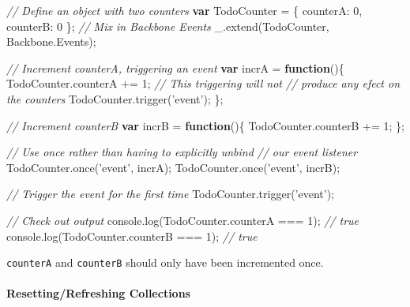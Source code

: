 \documentclass[9pt]{book}
\newenvironment{Shaded}{}{}
\newcommand{\KeywordTok}[1]{\textcolor[rgb]{0.00,0.44,0.13}{\textbf{{#1}}}}
\newcommand{\DataTypeTok}[1]{\textcolor[rgb]{0.56,0.13,0.00}{{#1}}}
\newcommand{\DecValTok}[1]{\textcolor[rgb]{0.25,0.63,0.44}{{#1}}}
\newcommand{\StringTok}[1]{\textcolor[rgb]{0.25,0.44,0.63}{{#1}}}
\newcommand{\CommentTok}[1]{\textcolor[rgb]{0.38,0.63,0.69}{\textit{{#1}}}}
\newcommand{\OtherTok}[1]{\textcolor[rgb]{0.00,0.44,0.13}{{#1}}}
\newcommand{\FunctionTok}[1]{\textcolor[rgb]{0.02,0.16,0.49}{{#1}}}
\newcommand{\NormalTok}[1]{{#1}}
\begin{document}
\begin{Shaded}
\begin{Highlighting}[]
\CommentTok{// Define an object with two counters}
\KeywordTok{var} \NormalTok{TodoCounter = \{ }\DataTypeTok{counterA}\NormalTok{: }\DecValTok{0}\NormalTok{, }\DataTypeTok{counterB}\NormalTok{: }\DecValTok{0} \NormalTok{\};}
\CommentTok{// Mix in Backbone Events}
\OtherTok{_}\NormalTok{.}\FunctionTok{extend}\NormalTok{(TodoCounter, }\OtherTok{Backbone}\NormalTok{.}\FunctionTok{Events}\NormalTok{);}

\CommentTok{// Increment counterA, triggering an event}
\KeywordTok{var} \NormalTok{incrA = }\KeywordTok{function}\NormalTok{()\{ }
  \OtherTok{TodoCounter}\NormalTok{.}\FunctionTok{counterA} \NormalTok{+= }\DecValTok{1}\NormalTok{; }
  \CommentTok{// This triggering will not }
  \CommentTok{// produce any efect on the counters}
  \OtherTok{TodoCounter}\NormalTok{.}\FunctionTok{trigger}\NormalTok{(}\StringTok{'event'}\NormalTok{); }
\NormalTok{\};}

\CommentTok{// Increment counterB}
\KeywordTok{var} \NormalTok{incrB = }\KeywordTok{function}\NormalTok{()\{ }
  \OtherTok{TodoCounter}\NormalTok{.}\FunctionTok{counterB} \NormalTok{+= }\DecValTok{1}\NormalTok{; }
\NormalTok{\};}

\CommentTok{// Use once rather than having to explicitly unbind}
\CommentTok{// our event listener}
\OtherTok{TodoCounter}\NormalTok{.}\FunctionTok{once}\NormalTok{(}\StringTok{'event'}\NormalTok{, incrA);}
\OtherTok{TodoCounter}\NormalTok{.}\FunctionTok{once}\NormalTok{(}\StringTok{'event'}\NormalTok{, incrB);}

\CommentTok{// Trigger the event for the first time}
\OtherTok{TodoCounter}\NormalTok{.}\FunctionTok{trigger}\NormalTok{(}\StringTok{'event'}\NormalTok{);}

\CommentTok{// Check out output}
\OtherTok{console}\NormalTok{.}\FunctionTok{log}\NormalTok{(}\OtherTok{TodoCounter}\NormalTok{.}\FunctionTok{counterA} \NormalTok{=== }\DecValTok{1}\NormalTok{); }\CommentTok{// true}
\OtherTok{console}\NormalTok{.}\FunctionTok{log}\NormalTok{(}\OtherTok{TodoCounter}\NormalTok{.}\FunctionTok{counterB} \NormalTok{=== }\DecValTok{1}\NormalTok{); }\CommentTok{// true}
\end{Highlighting}
\end{Shaded}

\texttt{counterA} and \texttt{counterB} should only have been
incremented once.

\paragraph{Resetting/Refreshing
Collections}\label{resettingrefreshing-collections}
\end{document}

